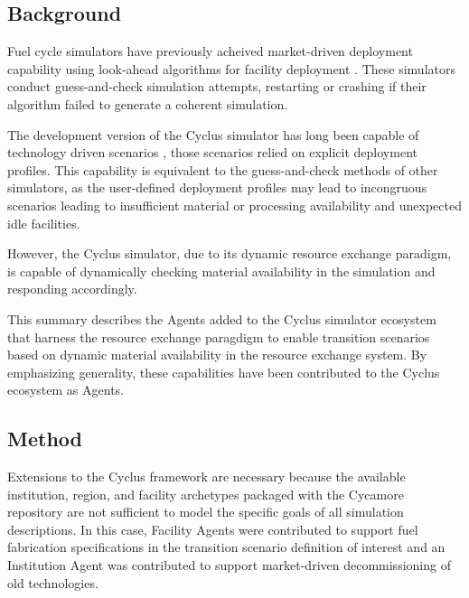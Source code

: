 

\subsection{Background}

Fuel cycle simulators have previously acheived market-driven deployment 
capability using look-ahead algorithms for facility deployment 
\cite{schneider_nfcsim_2005}.  These simulators conduct guess-and-check 
simulation attempts, restarting or crashing if their algorithm failed to 
generate a coherent simulation.


The development version of the Cyclus simulator has long been capable of 
technology driven scenarios \cite{gidden_cyclus_2012}, those scenarios relied 
on explicit deployment profiles. This capability is equivalent to the 
guess-and-check methods of other simulators, as the user-defined deployment 
profiles may lead to incongruous scenarios leading to insufficient material or 
processing availability and unexpected idle facilities.  

However, the Cyclus simulator, due to its dynamic resource exchange paradigm, is capable
of dynamically checking material availability in the simulation and responding
accordingly.  


This summary describes the Agents added to the Cyclus simulator ecosystem that 
harness the resource exchange paragdigm to enable transition scenarios based on 
dynamic material availability in the resource exchange system. By emphasizing 
generality, these capabilities have been contributed to the Cyclus ecosystem as 
Agents. 


\subsection{Method}

Extensions to the Cyclus framework are necessary because the available
institution, region, and facility archetypes packaged with the Cycamore
repository are not sufficient to model the specific goals of all simulation 
descriptions.  In this case, Facility Agents were contributed to support fuel fabrication specifications in the transition scenario
definition of interest and an Institution Agent was contributed to support 
market-driven decommissioning of old technologies.  



